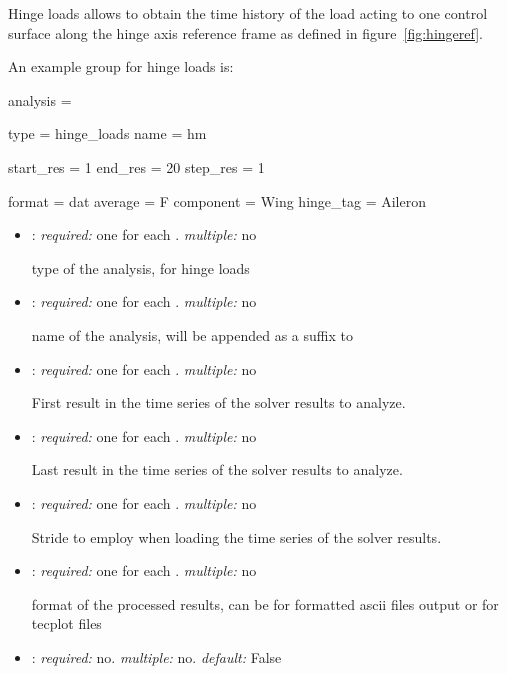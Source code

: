 Hinge loads allows to obtain the time history of the load acting to one control 
surface along the hinge axis reference frame as defined in figure~\ref{fig:hingeref}. 

An example  group for hinge loads is:

\begin{inputfile}
analysis = {
  type = hinge_loads
  name = hm

  start_res = 1
  end_res = 20
  step_res = 1

  format = dat
  average = F
  component = Wing
  hinge_tag = Aileron
}
\end{inputfile}

\begin{itemize}
\item {}: \textit{required:} one for each . \textit{multiple:} no

type of the analysis,  for hinge loads

\item {}: \textit{required:} one for each . \textit{multiple:} no

name of the analysis, will be appended as a suffix to 

\item {}: \textit{required:} one for each . \textit{multiple:} no

First result in the time series of the solver results to analyze.

\item {}: \textit{required:} one for each . \textit{multiple:} no

Last result in the time series of the solver results to analyze.

\item {}: \textit{required:} one for each . \textit{multiple:} no

Stride to employ when loading the time series of the solver results. 

\item {}: \textit{required:} one for each . \textit{multiple:} no

format of the processed results, can be  for formatted ascii files output or 
 for tecplot  files

\item {}: \textit{required:} no. \textit{multiple:} no. \textit{default:} False


\end{itemize}
